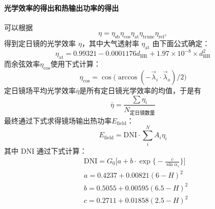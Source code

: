 \documentclass[../main.tex]{subfiles}
\begin{document}
\paragraph{光学效率的得出和热输出功率的得出}
可以根据
\begin{equation}
\eta = \eta _{\mathrm{s b}} \eta _{\cos} \eta _{\mathrm{at}} \eta _{\mathrm{trunc}} \eta _{\mathrm{ref}},
\end{equation}
得到定日镜的光学效率 \(\eta\)，其中大气透射率 \(\eta _{\mathrm{at}}\) 由下面公式确定：
\begin{equation}
\eta _{\mathrm{at}} = 0.99321 - 0.0001176 d _{\mathrm{HR}} + 1.97 \times 10 ^{-8} \times d _{\mathrm{HR}} ^{2}
\end{equation}
而余弦效率\(\eta _{\cos}\)使用下式计算：
\begin{equation}
\eta _{\cos} = \cos \big(\arccos (-\vec \lambda_{i} \cdot \vec \lambda_{o}) / 2\big)
\end{equation}
定日镜场平均光学效率\(\bar \eta\)是所有定日镜光学效率的均值，于是有
\begin{equation}
\bar \eta = \frac{\sum \eta_{i}}{N_{\text{定日镜数量}}}
\end{equation}
最终通过下式求得镜场输出热功率\(E_{\mathrm{field}}\)：
\begin{equation}
E_{\mathrm{field}} = \mathrm{DNI} \cdot \sum _{i} ^{N} A_{i} \eta _{i}
\end{equation}
其中 \(\mathrm{DNI}\) 通过下式计算：
\begin{equation}
\begin{aligned}
& \mathrm{DNI} = G_{0} \bigg[ a + b \cdot \exp\Big\{{-}\frac{c}{\sin \alpha_{s}}\Big\}\bigg]\\
& a = 0.4237 + 0.00821 (6 - H) ^{2} \\
& b = 0.5055 + 0.00595(6.5 - H) ^{2} \\
& c = 0.2711 + 0.01858 (2.5 - H) ^{2}
\end{aligned}
\end{equation}
\end{document}
